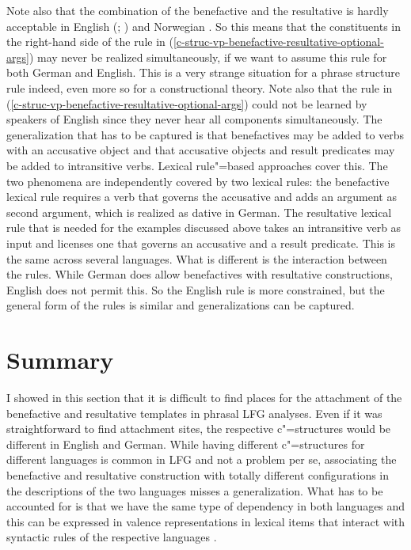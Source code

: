 Note also that the combination of the benefactive and the resultative is hardly acceptable in
English (\citealt[]{BZ90a}; \citealt*[]{BATW2015a}) and Norwegian \citep{Tungseth2007a-u}.
\z
So this means that the constituents in the right-hand side of the rule in
(\ref{c-struc-vp-benefactive-resultative-optional-args}) may never be realized simultaneously, if we
want to assume this rule for both German and English. This is a
very strange situation for a phrase structure rule indeed, even more so for a constructional
theory. Note also that the rule in (\ref{c-struc-vp-benefactive-resultative-optional-args}) could
not be learned by speakers of English since they never hear all components simultaneously.
The generalization that has to be captured is that benefactives may be added to verbs with
an accusative object and that accusative objects and result predicates may be added to intransitive
verbs. Lexical rule"=based approaches cover this. The two phenomena are independently covered by two
lexical rules: the benefactive lexical rule requires a verb that governs the accusative and adds an
argument as second argument, which is realized as dative in German. The resultative lexical rule
that is needed for the examples discussed above takes an intransitive verb as input and licenses one
that governs an accusative and a result predicate. This is the same across several languages. What is
different is the interaction between the rules. While German does allow benefactives with
resultative constructions, English does not permit this. So the English rule is more constrained, but
the general form of the rules is similar and generalizations can be captured.


\section{Summary}

I showed in this section that it is difficult to find places for the attachment of the benefactive
and resultative templates in phrasal LFG analyses. Even if it was straightforward to find
attachment sites, the respective c"=structures would be different in English and German. While
having different c"=structures for different languages is common in LFG and not a problem per se,
associating the benefactive and resultative construction with totally different configurations in
the descriptions of the two languages misses a generalization. What has to be accounted for is
that we have the same type of dependency in both languages and this can be expressed in valence
representations in lexical items that interact with syntactic rules of the respective languages \citep{MuellerLexikon}.

